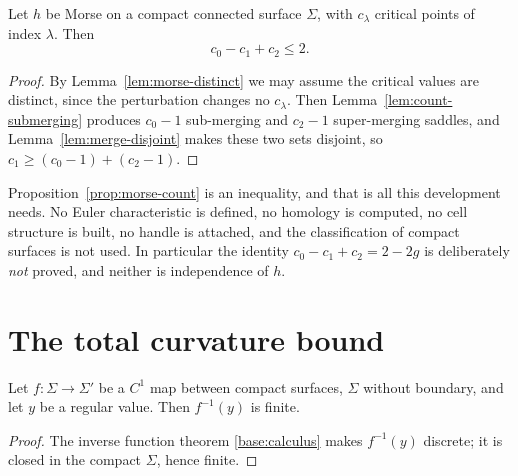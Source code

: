\begin{proposition}\label{prop:morse-count}
Let $h$ be Morse on a compact connected surface $\Sigma$, with $c_\lambda$
critical points of index $\lambda$.  Then
\begin{equation}\label{eq:morse-count}
  c_0-c_1+c_2\le2 .
\end{equation}
\end{proposition}

\begin{proof}
By Lemma~\ref{lem:morse-distinct} we may assume the critical values are
distinct, since the perturbation changes no $c_\lambda$.  Then
Lemma~\ref{lem:count-submerging} produces $c_0-1$ sub-merging and $c_2-1$
super-merging saddles, and Lemma~\ref{lem:merge-disjoint} makes these two sets
disjoint, so $c_1\ge(c_0-1)+(c_2-1)$.
\end{proof}

\begin{remark}\label{rem:no-euler}
Proposition~\ref{prop:morse-count} is an inequality, and that is all this
development needs.  No Euler characteristic is defined, no homology is
computed, no cell structure is built, no handle is attached, and the
classification of compact surfaces is not used.  In particular the identity
$c_0-c_1+c_2=2-2g$ is deliberately \emph{not} proved, and neither is
independence of $h$.
\end{remark}

\section{The total curvature bound}\label{sec:total-curvature}

\begin{lemma}\label{lem:regular-fiber-finite}
Let $f:\Sigma\to\Sigma'$ be a $C^1$ map between compact surfaces, $\Sigma$
without boundary, and let $y$ be a regular value.  Then $f^{-1}(y)$ is finite.
\end{lemma}

\begin{proof}
The inverse function theorem \ref{base:calculus} makes $f^{-1}(y)$ discrete;
it is closed in the compact $\Sigma$, hence finite.
\end{proof}

